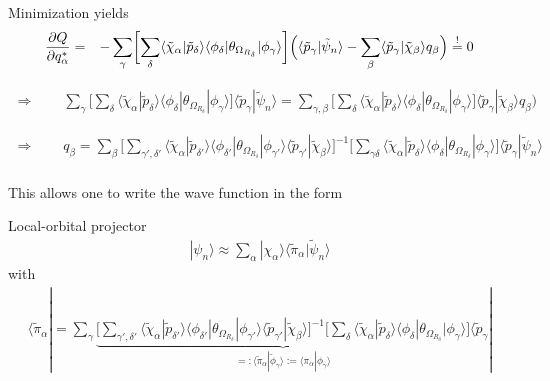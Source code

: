 \documentclass[11pt,a4paper]{report}
\begin{document}
Minimization yields
\begin{eqnarray}
\frac{\partial Q}{\partial q^*_\alpha}
&=&
-\sum_{\gamma}
\biggl[
\sum_{\delta}
\langle\tilde{\chi}_\alpha|\tilde{p}_\delta\rangle
\langle\phi_\delta|\theta_{\Omega_{R_\delta}}|\phi_\gamma\rangle
\biggr]
\Bigl(\langle\tilde{p}_\gamma|\tilde{\psi}_n\rangle
-\sum_\beta \langle\tilde{p}_\gamma|\tilde{\chi}_\beta\rangle q_\beta\Bigr)
\stackrel{!}{=}0
\nonumber
\end{eqnarray}


\begin{eqnarray}
\Rightarrow\qquad\sum_{\gamma}
\biggl[
\sum_{\delta}
\langle\tilde{\chi}_\alpha|\tilde{p}_\delta\rangle
\langle\phi_\delta|\theta_{\Omega_{R_\delta}}|\phi_\gamma\rangle
\biggr]
\langle\tilde{p}_\gamma|\tilde{\psi}_n\rangle
=
\sum_{\gamma,\beta}
\biggl[
\sum_{\delta}
\langle\tilde{\chi}_\alpha|\tilde{p}_\delta\rangle
\langle\phi_\delta|\theta_{\Omega_{R_\delta}}|\phi_\gamma\rangle
\biggr]
\langle\tilde{p}_\gamma|\tilde{\chi}_\beta\rangle q_\beta\Bigr)
\nonumber
\end{eqnarray}

\begin{eqnarray}
\Rightarrow\qquad
q_\beta=
\sum_{\beta}
\biggl[
\sum_{\gamma',\delta'}
\langle\tilde{\chi}_\alpha|\tilde{p}_{\delta'}\rangle
\langle\phi_{\delta'}|\theta_{\Omega_{R_\delta}}|\phi_{\gamma'}\rangle
\langle\tilde{p}_{\gamma'}|\tilde{\chi}_\beta\rangle 
\biggr]^{-1}
\biggl[
\sum_{\gamma\delta}
\langle\tilde{\chi}_\alpha|\tilde{p}_\delta\rangle
\langle\phi_\delta|\theta_{\Omega_{R_\delta}}|\phi_\gamma\rangle
\biggr]
\langle\tilde{p}_\gamma|\tilde{\psi}_n\rangle
\nonumber\\
\end{eqnarray}

This allows one to write the wave function in the form
\begin{myshadowminipage}{Local-orbital projector}
\begin{eqnarray}
|\psi_n\rangle\approx
\sum_\alpha|\chi_\alpha\rangle\langle\tilde{\pi}_\alpha|\tilde{\psi}_n\rangle
\end{eqnarray}
with
\begin{eqnarray}
\langle\tilde{\pi}_\alpha|=
\sum_\gamma 
\underbrace{
\biggl[
\sum_{\gamma',\delta'}
\langle\tilde{\chi}_\alpha|\tilde{p}_{\delta'}\rangle
\langle\phi_{\delta'}|\theta_{\Omega_{R_\delta}}|\phi_{\gamma'}\rangle
\langle\tilde{p}_{\gamma'}|\tilde{\chi}_\beta\rangle 
\biggr]^{-1}
\biggl[
\sum_{\delta}
\langle\tilde{\chi}_\alpha|\tilde{p}_\delta\rangle
\langle\phi_\delta|\theta_{\Omega_{R_\delta}}|\phi_\gamma\rangle
\biggr]
}_{
=:\langle\tilde{\pi}_\alpha|\tilde{\phi}_\gamma\rangle
:=\langle\pi_\alpha|\phi_\gamma\rangle
}
\langle\tilde{p}_\gamma|
\label{eq:pitilde}
\end{eqnarray}
\end{myshadowminipage}
\end{document}
